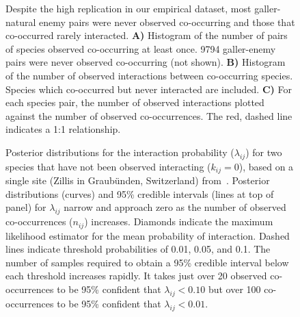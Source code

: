 \documentclass[12pt]{article}
\begin{document}
  \begin{figure}[h!]
      \caption{Despite the high replication in our empirical dataset, most galler-natural enemy pairs were never observed co-occurring and those that co-occurred rarely interacted. \textbf{A)} Histogram of the number of pairs of species observed co-occurring at least once. 9794 galler-enemy pairs were never observed co-occurring (not shown).
      \textbf{B)} Histogram of the number of observed interactions between co-occurring species. Species which co-occurred but never interacted are included. 
      \textbf{C)} For each species pair, the number of observed interactions plotted against the number of observed co-occurrences. The red, dashed line indicates a 1:1 relationship.}
      \label{histograms}
      \begin{center}
      \end{center}
      \end{figure}


  \begin{figure}[h!]
    \caption{Posterior distributions for the interaction probability ($\lambda_{ij}$) for two species that have not been observed interacting ($k_{ij}=0$), based on a single site (Zillis in Graub\"{u}nden, Switzerland) from~\citet{Kopelke2017}. Posterior distributions (curves) and 95\% credible intervals (lines at top of panel) for $\lambda_{ij}$ narrow and approach zero as the number of observed co-occurrences ($n_{ij}$) increases. Diamonds indicate the maximum likelihood estimator for the mean probability of interaction.
    Dashed lines indicate threshold probabilities of 0.01, 0.05, and 0.1. The number of samples required to obtain a 95\% credible interval below each threshold increases rapidly. It takes just over 20 observed co-occurrences to be 95\% confident that $\lambda_{ij}<0.10$ but over 100 co-occurrences to be 95\% confident that $\lambda_{ij}<0.01$.}
    \label{Salix_pdfs_cdfs}
    \begin{center}
    \end{center}
    \end{figure}
\end{document}
